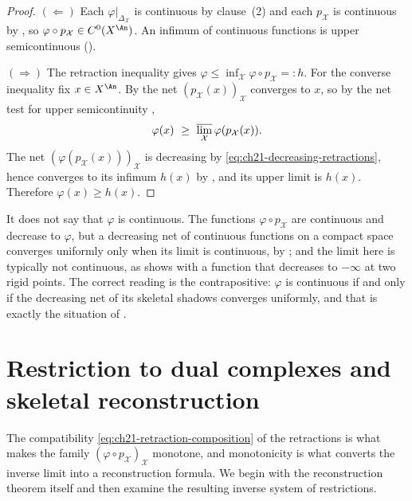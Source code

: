 \begin{proof}
$(\Leftarrow)$  Each $\varphi|_{\Delta_{\mathcal X}}$ is continuous by
clause~(2) and each $p_{\mathcal X}$ is continuous by
, so $\varphi\circ p_{\mathcal X}\in
C^0(X^{\An})$.  An infimum of continuous functions is upper
semicontinuous ().

$(\Rightarrow)$  The retraction inequality gives
$\varphi\leq\inf_{\mathcal X}\varphi\circ p_{\mathcal X}=:h$.  For the
converse inequality fix $x\in X^{\An}$.  By
 the net $(p_{\mathcal X}(x))_{\mathcal X}$
converges to $x$, so by the net test for upper semicontinuity
,
\[
 \varphi(x)\ \geq\ \varlimsup_{\mathcal X}\varphi(p_{\mathcal X}(x)).
\]
The net $(\varphi(p_{\mathcal X}(x)))_{\mathcal X}$ is decreasing by
\eqref{eq:ch21-decreasing-retractions}, hence converges to its infimum
$h(x)$ by , and its upper limit is
$h(x)$.  Therefore $\varphi(x)\geq h(x)$.
\end{proof}

\begin{remark}
\label{rem:ch21-usc-not-continuity}
It does not say that $\varphi$ is continuous.  The functions
$\varphi\circ p_{\mathcal X}$ are continuous and decrease to $\varphi$,
but a decreasing net of continuous functions on a compact space converges
uniformly only when its limit is continuous, by
; and the limit here is typically not continuous, as
 shows with a function that decreases to
$-\infty$ at two rigid points.  The correct reading is the
contrapositive: $\varphi$ is continuous if and only if the decreasing net
of its skeletal shadows converges uniformly, and that is exactly the
situation of .
\end{remark}

\section{Restriction to dual complexes and skeletal reconstruction}
\label{sec:ch21-restriction}

The compatibility \eqref{eq:ch21-retraction-composition} of the retractions
is what makes the family $(\varphi\circ p_{\mathcal X})_{\mathcal X}$
monotone, and monotonicity is what converts the inverse limit
 into a reconstruction formula.  We begin
with the reconstruction theorem itself and then examine the resulting
inverse system of restrictions.

